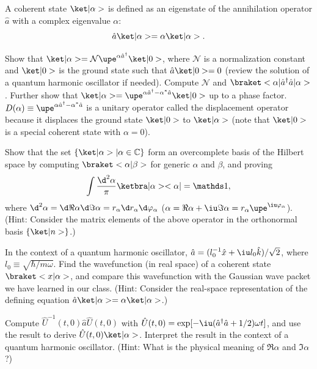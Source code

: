 \begin{problem}
  A coherent state $\ket|\alpha>$ is defined as an eigenstate of the annihilation
  operator $\hat a$ with a complex eigenvalue $\alpha$:
  \[
    \hat a \ket|\alpha> = \alpha \ket|\alpha>.
  \]
  \begin{enumext}
    \item Show that $\ket|\alpha> = \mathcal N\upe^{\alpha \hat a^\dagger} \ket|0>$,
    where $\mathcal N$ is a normalization constant and $\ket|0>$ is the ground state such that $\hat a\ket|0> = 0$ (review the solution of a quantum harmonic oscillator if needed).
    Compute $\mathcal N$ and $\braket<\alpha|\hat a^\dagger \hat a|\alpha>$.
    Further show that $\ket|\alpha> = \upe^{\alpha\hat a^\dagger-\alpha^*\hat a} \ket|0>$
    up to a phase factor.
    $D(\alpha) \equiv \upe^{\alpha\hat a^\dagger-\alpha^*\hat a}$
    is a unitary operator called the displacement operator because it displaces the ground state $\ket|0>$ to $\ket|\alpha>$ (note that $\ket|0>$ is a special coherent state with $\alpha = 0$).
    \item Show that the set $\{\ket|\alpha> | \alpha \in \mathbb C\}$
    form an overcomplete basis of the Hilbert space by computing
    $\braket<\alpha|\beta>$ for generic $\alpha$ and $\beta$, and proving
    \[
      \int \frac{\d^2\alpha}{\pi} \ketbra|\alpha><\alpha| = \identity,
    \]
    where $\d^2\alpha = \d \Re\alpha \d\Im\alpha = r_\alpha \d r_\alpha\d \varphi_\alpha$ ($\alpha = \Re\alpha + \iu\Im\alpha = r_\alpha\upe^{\iu\varphi_\alpha}$).
    (Hint: Consider the matrix elements of the above operator in the orthonormal basis $\{\ket|n>\}$.)
    \item In the context of a quantum harmonic oscillator,
    $\hat a = (l^{-1}_0 \hat x + \iu l_0\hat k)/\sqrt2$,
    where $l_0 \equiv \sqrt{\hbar/m\omega}$.
    Find the wavefunction (in real space) of a coherent state $\braket<x|\alpha>$,
    and compare this wavefunction with the Gaussian wave packet we have learned in our class.
    (Hint: Consider the real-space representation of the defining equation $\hat a\ket|\alpha> = \alpha\ket|\alpha>$.)
    \item Compute $\hat U^{-1}(t,0) \hat a \hat U(t,0)$ with
    $\hat U(t,0) = \exp[-\iu(\hat a^\dagger\hat a + 1/2)\omega t]$,
    and use the result to derive $\hat U(t,0) \ket|\alpha>$.
    Interpret the result in the context of a quantum harmonic oscillator.
    (Hint: What is the physical meaning of $\Re\alpha$ and $\Im\alpha$?)
  \end{enumext}
\end{problem}
